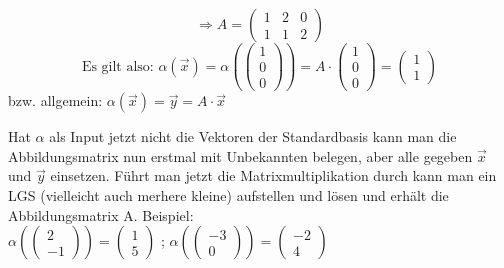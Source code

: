 \documentclass[a4paper,10pt]{scrartcl}
\begin{document}
            \[
                \Rightarrow A = 
                \begin{pmatrix}
                    1 & 2 & 0\\
                    1 & 1 & 2
                \end{pmatrix}
            \]
            \[
                \text{Es gilt also: }\alpha(\vec{x}) = \alpha(\begin{pmatrix} 1 \\ 0 \\ 0 \end{pmatrix}) 
                = A \cdot \begin{pmatrix} 1 \\ 0 \\ 0 \end{pmatrix} = \begin{pmatrix} 1 \\ 1 \end{pmatrix} 
            \] 
            bzw. allgemein: $\alpha(\vec{x}) = \vec{y} = A \cdot \vec{x}$ 
            
            \newpage
            Hat $\alpha$ als Input jetzt nicht die Vektoren der Standardbasis kann man die Abbildungsmatrix nun erstmal mit Unbekannten belegen, aber alle gegeben $\vec{x}$ und $\vec{y}$
            einsetzen. Führt man jetzt die Matrixmultiplikation durch kann man ein LGS (vielleicht auch merhere kleine) aufstellen und lösen und erhält die Abbildungsmatrix A. Beispiel: \\
            $
            \alpha(\begin{pmatrix}
                2 \\ -1
            \end{pmatrix}) = 
            \begin{pmatrix}
                1 \\ 5
            \end{pmatrix}$ ;
            $\alpha(
                \begin{pmatrix}
                -3 \\ 0
            \end{pmatrix}) = \begin{pmatrix}
                -2 \\ 4
            \end{pmatrix}$ 
\end{document}
